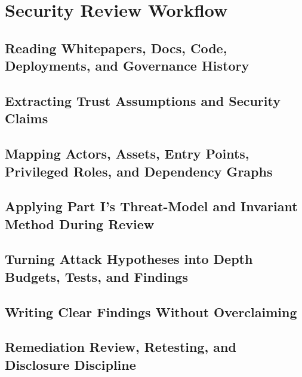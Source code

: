 \chapter{Security Review Workflow}

\section{Reading Whitepapers, Docs, Code, Deployments, and Governance History}

\section{Extracting Trust Assumptions and Security Claims}

\section{Mapping Actors, Assets, Entry Points, Privileged Roles, and Dependency Graphs}

\section{Applying Part I's Threat-Model and Invariant Method During Review}

\section{Turning Attack Hypotheses into Depth Budgets, Tests, and Findings}

\section{Writing Clear Findings Without Overclaiming}

\section{Remediation Review, Retesting, and Disclosure Discipline}
